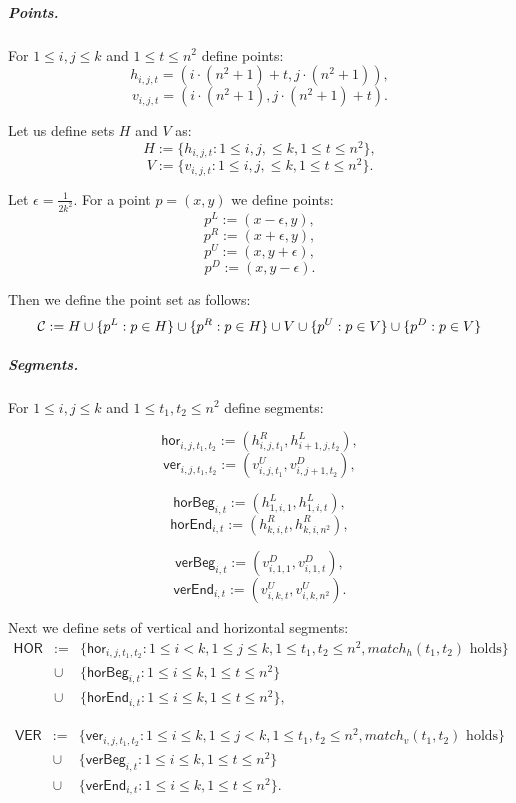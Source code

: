 \subparagraph{Points.}

For $1 \le i,j \le k$ and $1 \le t \le n^2$ define points:
	$$h_{i, j, t} = (i \cdot (n^2+1) + t, j \cdot (n^2+1)),$$
	$$v_{i, j, t} = (i \cdot (n^2+1), j \cdot (n^2+1) + t).$$
	
Let us define sets $H$ and $V$ as:
$$H := \{h_{i, j, t} : 1 \le i, j, \le k, 1 \le t \le n^2\},$$
$$V := \{v_{i, j, t} : 1 \le i, j, \le k, 1 \le t \le n^2\}.$$
	
Let $\epsilon = \frac{1}{2k^2}$.
For a point $p = (x, y)$ we define points:
$$p^{L} := (x - \epsilon, y),$$
$$p^{R} := (x + \epsilon, y),$$
$$p^{U} := (x, y + \epsilon),$$
$$p^{D} := (x, y - \epsilon).$$

Then we define the point set as follows:
$$\mathcal{C} := H \cup \{p^L : p \in H\} \cup \{p^R : p \in H\}
\cup V \cup \{p^U : p \in V\} \cup \{p^D : p \in V\} $$


\subparagraph{Segments.}
\newcommand{\hor}[4]{\mathsf{hor}_{#1,#2,#3,#4}}
\newcommand{\ver}[4]{\mathsf{ver}_{#1,#2,#3,#4}}
\newcommand{\horbeg}[2]{\mathsf{horBeg}_{#1,#2}}
\newcommand{\verbeg}[2]{\mathsf{verBeg}_{#1,#2}}
\newcommand{\horend}[2]{\mathsf{horEnd}_{#1,#2}}
\newcommand{\verend}[2]{\mathsf{verEnd}_{#1,#2}}

For $1 \le i,j \le k$ and $1 \le t_1, t_2 \le n^2$ define segments:

$$\hor{i}{j}{t_1}{t_2} := (h^R_{i,j,t_1}, h^L_{i+1, j, t_2}),$$
$$\ver{i}{j}{t_1}{t_2} := (v^U_{i,j,t_1}, v^D_{i, j+1, t_2}),$$

$$\horbeg{i}{t} := (h^L_{1, i, 1}, h^L_{1, i, t}),$$
$$\horend{i}{t} := (h^R_{k, i, t}, h^R_{k, i, n^2}),$$

$$\verbeg{i}{t} := (v^D_{i, 1, 1}, v^D_{i, 1, t}),$$
$$\verend{i}{t} := (v^U_{i, k, t}, v^U_{i, k, n^2}).$$

\newcommand{\allhor}{\mathsf{HOR}}
\newcommand{\allver}{\mathsf{VER}}
\newcommand{\alldiag}{\mathsf{DIAG}}

Next we define sets of vertical and horizontal segments:
\begin{eqnarray*}
\allhor &:= &\{\hor{i}{j}{t_1}{t_2} : 1 \le i < k, 1 \le j \le k,
1 \le t_1, t_2 \le n^2, match_h(t_1, t_2) \text{ holds}\} \\
&\cup &\{\horbeg{i}{t} : 1 \le i \le k, 1 \le t \le n^2\}
\\
&\cup &\{\horend{i}{t} : 1 \le i \le k, 1 \le t \le n^2\},
\end{eqnarray*}

\begin{eqnarray*}
\allver &:= &\{\ver{i}{j}{t_1}{t_2} : 1 \le i \le k, 1 \le j < k,
1 \le t_1, t_2 \le n^2, match_v(t_1, t_2) \text{ holds}\} \\
&\cup &\{\verbeg{i}{t} : 1 \le i \le k, 1 \le t \le n^2\}
\\
&\cup &\{\verend{i}{t} : 1 \le i \le k, 1 \le t \le n^2\}.
\end{eqnarray*}

